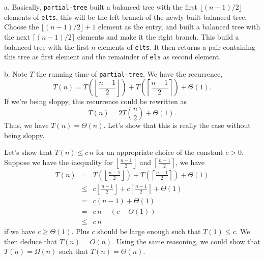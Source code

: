 \documentclass[a4paper,12pt]{article}
\newcommand{\subpar}[1] {\medskip \noindent #1.} \lstset{language=Lisp}
\begin{document}
\subpar{a}  Basically, \lstinline!partial-tree! built a balanced tree
with the first $\lfloor (n-1)/2 \rfloor$ elements of \lstinline!elts!,
this will be the left branch of the newly built balanced tree.  Choose
the $\lfloor (n-1)/2\rfloor + 1$ element as the entry, and built a
balanced tree with the next $\lceil (n-1)/2\rceil$ elements and make it the
right branch.  This build a balanced tree with the first $n$ elements
of \lstinline!elts!.  It then returns a pair containing this tree as
first element and the remainder of \lstinline!els! as second element.

\subpar{b}  Note $T$ the running time of \lstinline!partial-tree!.  We
have the recurrence,
\[ T(n) = T\left(\left\lfloor\frac{n-1}{2}\right\rfloor\right) +
T\left(\left\lceil\frac{n-1}{2}\right\rceil\right) + \Theta(1).\]
If we're being sloppy, this recurrence could be rewritten as
\[ T(n) = 2T\left(\frac{n}{2}\right) + \Theta(1).\]
Thus, we have $T(n) = \Theta(n)$.  Let's show that this is really the
case without being sloppy.

Let's show that $T(n) \le c\,n$ for an appropriate choice of the
constant $c>0$.  Suppose we have the inequality for
$\left\lfloor\frac{n-1}{2}\right\rfloor$ and
$\left\lceil\frac{n-1}{2}\right\rceil$, we have
\begin{eqnarray*}
  T(n) &=& T\left(\left\lfloor\frac{n-1}{2}\right\rfloor\right) +
  T\left(\left\lceil\frac{n-1}{2}\right\rceil\right) + \Theta(1) \\
  &\le& c\left\lfloor\frac{n-1}{2}\right\rfloor +
  c\left\lceil\frac{n-1}{2}\right\rceil + \Theta(1) \\
  &=& c(n-1) + \Theta(1) \\
  &=& c\,n - (c - \Theta(1)) \\
  &\le& c\,n
\end{eqnarray*}
if we have $c \ge \Theta(1)$.  Plus $c$ should be large enough
such that $T(1) \le c$.  We then deduce that $T(n) = O(n)$.  Using
the same reasoning, we could show that $T(n) = \Omega(n)$ such that
$T(n) = \Theta(n)$.
\end{document}
